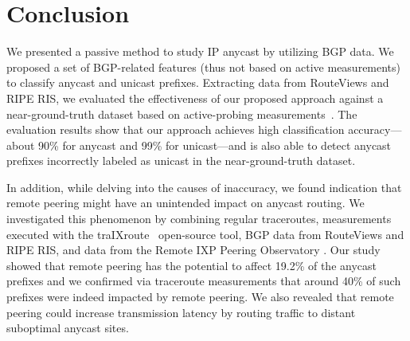 
\section{Conclusion}
\label{sec:con}

We presented a passive method to study IP anycast by utilizing BGP data.  We
proposed a set of BGP-related features (thus not based on active measurements)
to classify anycast and unicast prefixes. Extracting data from RouteViews and
RIPE RIS, we evaluated the effectiveness of our proposed approach against a
near-ground-truth dataset based on active-probing
measurements~\cite{cicalese2015characterizing}. The evaluation results show that
our approach achieves high classification accuracy---about 90\% for anycast and
99\% for unicast---and is also able to detect anycast prefixes incorrectly
labeled as unicast in the near-ground-truth dataset. 

In addition, while delving into the causes of inaccuracy, we found indication
that remote peering might have an unintended impact on anycast routing. We
investigated this phenomenon by combining regular traceroutes, measurements
executed with the traIXroute~\cite{traixroute, traixroute:pam} open-source tool,
BGP data from RouteViews and RIPE RIS, and data from the Remote IXP Peering
Observatory \cite{RPJedi}.  Our study showed that remote peering has the
potential to affect 19.2\% of the anycast prefixes and we confirmed via
traceroute measurements that around 40\% of such prefixes were indeed impacted
by remote peering.  We also revealed that remote peering could increase
transmission latency by routing traffic to distant suboptimal anycast sites.

